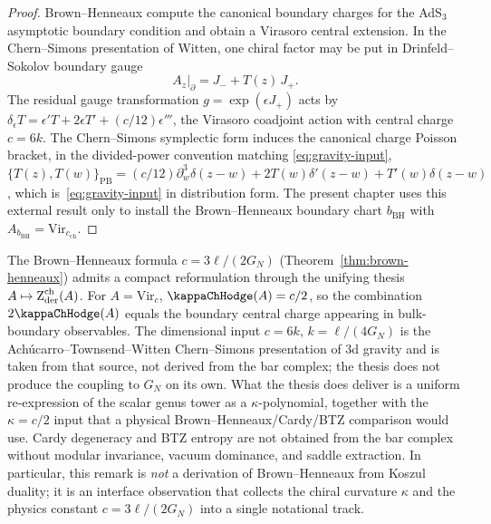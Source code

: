 \begin{proof}
Brown--Henneaux compute the canonical boundary charges for the
AdS$_3$ asymptotic boundary condition and obtain a Virasoro central
extension.  In the Chern--Simons presentation of Witten, one chiral
factor may be put in Drinfeld--Sokolov boundary gauge
\[
A_z|_{\partial} = J_- + T(z)\,J_+ .
\]
The residual gauge transformation \(g=\exp(\epsilon J_+)\) acts by
$\delta_\epsilon T = \epsilon' T + 2\epsilon T' +
(c/12)\epsilon'''$, the Virasoro coadjoint action with
central charge \(c=6k\).  The Chern--Simons symplectic form induces
the canonical charge Poisson bracket, in the divided-power convention
matching
\eqref{eq:gravity-input},
$\{T(z), T(w)\}_{\mathrm{PB}} = (c/12)\partial_w^3\delta(z-w) +
2T(w)\delta'(z-w) + T'(w)\delta(z-w)$,
which is~\eqref{eq:gravity-input} in distribution form.
The present chapter uses this external result only to install the
Brown--Henneaux boundary chart \(b_{\mathrm{BH}}\) with
\(A_{b_{\mathrm{BH}}}=\mathrm{Vir}_{c_{\mathrm{ch}}}\).
\end{proof}

\begin{remark}
\label{rem:brown-henneaux-from-thesis}
The Brown--Henneaux formula $c = 3\ell/(2G_N)$
(Theorem~\ref{thm:brown-henneaux}) admits a compact reformulation
through the unifying thesis
$A \mapsto \operatorname{Z}_{\mathrm{der}}^{\mathrm{ch}}(A)$. For $A = \mathrm{Vir}_c$,
$\kappaChHodge(A) = c/2$, so the combination $2\kappaChHodge(A)$
equals the boundary central charge appearing in
bulk-boundary observables. The dimensional input
$c = 6k$, $k = \ell/(4G_N)$ is the Ach\'ucarro--Townsend--Witten
Chern--Simons presentation of 3d gravity and is taken from
that source, not derived from the bar complex; the thesis
does not produce the coupling to $G_N$ on its own. What the thesis
does deliver is a uniform re-expression of the scalar genus tower as a
\(\kappa\)-polynomial, together with the \(\kappa=c/2\) input that a
physical Brown--Henneaux/Cardy/BTZ comparison would use. Cardy
degeneracy and BTZ entropy are not obtained from the bar complex
without modular invariance, vacuum dominance, and saddle extraction.
In particular, this remark is
\emph{not} a derivation of Brown--Henneaux from Koszul duality;
it is an interface observation that collects the chiral
curvature $\kappa$ and the physics constant $c = 3\ell/(2G_N)$
into a single notational track.
\end{remark}

